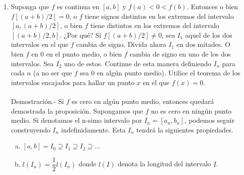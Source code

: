 \begin{enumerate}[\bfseries 1.]
    \item Suponga que $f$ es continua en $[a,b]$ y $f(a)<0<f(b)$. Entonces o bien $f[(a+b)/2] = 0$, o $f$ tiene signos distintos en los extremos del intervalo $[a,(a+b)/2]$, o bien $f$ tiene distintos en los extremos del intervalo $[(a+b)/2,b]$. ¿Por qué? Si $f[(a+b)/2]\neq 0$, sea $I_1$ aquel de los dos intervalos en el que $f$ cambia de signo. Divida ahora $I_1$ en dos mitades. O bien $f$ en $0$ en el punto medio, o bien $f$ cambia de signo en uno de los dos intervalos. Sea $I_2$ uno de estos. Continue de esta manera definiendo $I_n$ para cada $n$ (a no ser que $f$ sea $0$ en algún punto medio). Utilice el teorema de los intervalos encajados para hallar un punto $x$ en el que $f(x)=0$.\\\\
	Demostración.-\; Si $f$ es cero en algún punto medio, entonces quedará demostrada la proposición. Supongamos que $f$ no es cero en ningún punto medio. Si denotamos el n-simo intervalo por $I_n=[a_n,b_n]$, podemos seguir construyendo $I_n$ indefinidamente. Esta $I_n$ tendrá la siguientes propiedades.
	\begin{enumerate}[(a)]
	    \item $[a,b] = I_0 \supseteq I_1 \supseteq I_2 \supseteq \ldots$
	    \item $l(I_n) = \dfrac{1}{2} l(I_n)$ donde $l(I)$ denota la longitud del intervalo $I$.
	\end{enumerate}


\end{enumerate}
